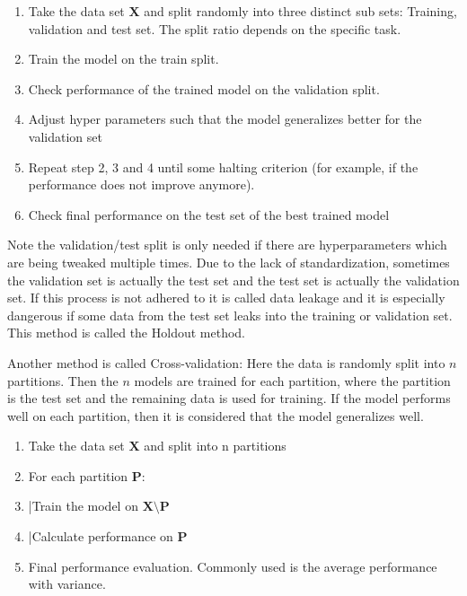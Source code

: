 \documentclass[draft,final,oneside]{vutinfth} %
\begin{document}
\begin{enumerate}
\item Take the data set $\boldsymbol{X}$ and split randomly into three distinct sub sets: Training, validation and test set. The split ratio depends on the specific task.
\item Train the model on the train split.
\item Check performance of the trained model on the validation split.
\item Adjust hyper parameters such that the model generalizes better for the validation set
\item Repeat step 2, 3 and 4 until some halting criterion (for example, if the performance does not improve anymore).
\item Check final performance on the test set of the best trained model
\end{enumerate}
Note the validation/test split is only needed if there are hyperparameters which are being tweaked multiple times.
Due to the lack of standardization, sometimes the validation set is actually the test set and the test set is actually the validation set.
If this process is not adhered to it is called data leakage and it is especially dangerous if some data from the test set leaks into the training or validation set. 
This method is called the Holdout method. 


Another method is called Cross-validation: Here the data is randomly split into $n$ partitions. Then the $n$ models are trained for each partition, where the partition is the test set and the remaining data is used for training. If the model performs well on each partition, then it is considered that the model generalizes well.

\begin{enumerate}
\item Take the data set $\boldsymbol{X}$ and split into n partitions
\item For each partition $\boldsymbol{P}$:
\item |\quad Train the model on $\boldsymbol{X} \setminus \boldsymbol{P}$
\item |\quad Calculate performance on $\boldsymbol{P}$
\item Final performance evaluation. Commonly used is the average performance with variance.
\end{enumerate}

\end{document}
